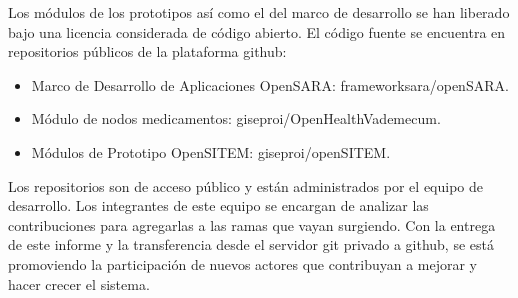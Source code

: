 Los módulos de los prototipos así como el del marco de desarrollo se han liberado bajo una licencia considerada de código abierto. El código fuente se encuentra en repositorios públicos de la plataforma github:
\begin{itemize}
 \item Marco de Desarrollo de Aplicaciones OpenSARA: frameworksara/openSARA.
 \item Módulo de nodos medicamentos: giseproi/OpenHealthVademecum.
 \item Módulos de Prototipo OpenSITEM: giseproi/openSITEM.
\end{itemize}

Los repositorios son de acceso público y están administrados por el equipo de desarrollo. Los integrantes de este equipo se encargan de analizar las contribuciones para agregarlas a las ramas que vayan surgiendo. Con la entrega de este informe y la transferencia desde el servidor git privado a github, se está promoviendo la participación de nuevos actores que contribuyan a mejorar y hacer crecer el sistema.
